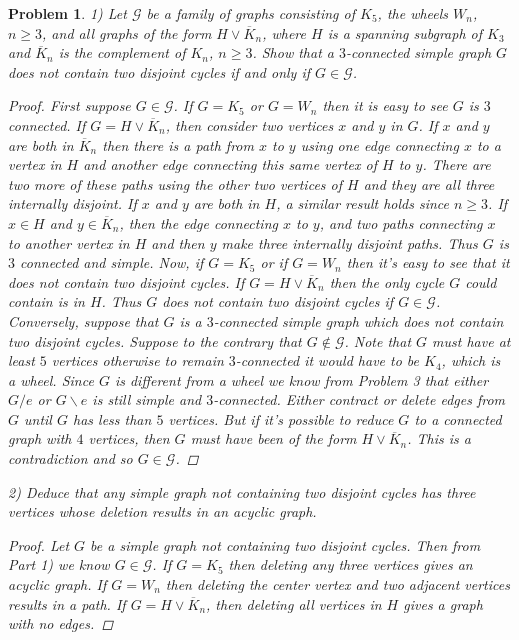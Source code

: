 \documentclass{article}
\newtheorem{problem}{Problem}
\begin{document}
\begin{problem}
1) Let $\mathcal{G}$ be a family of graphs consisting of $K_5$, the wheels $W_n$, $n \geq 3$, and all graphs of the form $H \vee \overline{K}_n$, where $H$ is a spanning subgraph of $K_3$ and $\overline{K}_n$ is the complement of $K_n$, $n \geq 3$. Show that a $3$-connected simple graph $G$ does not contain two disjoint cycles if and only if $G \in \mathcal{G}$.
\begin{proof}
First suppose $G \in \mathcal{G}$. If $G = K_5$ or $G = W_n$ then it is easy to see $G$ is $3$ connected. If $G = H \vee \overline{K}_n$, then consider two vertices $x$ and $y$ in $G$. If $x$ and $y$ are both in $\overline{K}_n$ then there is a path from $x$ to $y$ using one edge connecting $x$ to a vertex in $H$ and another edge connecting this same vertex of $H$ to $y$. There are two more of these paths using the other two vertices of $H$ and they are all three internally disjoint. If $x$ and $y$ are both in $H$, a similar result holds since $n \geq 3$. If $x \in H$ and $y \in \overline{K}_n$, then the edge connecting $x$ to $y$, and two paths connecting $x$ to another vertex in $H$ and then $y$ make three internally disjoint paths. Thus $G$ is $3$ connected and simple. Now, if $G = K_5$ or if $G = W_n$ then it's easy to see that it does not contain two disjoint cycles. If $G = H \vee \overline{K}_n$ then the only cycle $G$ could contain is in $H$. Thus $G$ does not contain two disjoint cycles if $G \in \mathcal{G}$.
Conversely, suppose that $G$ is a $3$-connected simple graph which does not contain two disjoint cycles. Suppose to the contrary that $G \notin \mathcal{G}$. Note that $G$ must have at least $5$ vertices otherwise to remain $3$-connected it would have to be $K_4$, which is a wheel. Since $G$ is different from a wheel we know from Problem 3 that either $G/e$ or $G \backslash e$ is still simple and $3$-connected. Either contract or delete edges from $G$ until $G$ has less than $5$ vertices. But if it's possible to reduce $G$ to a connected graph with $4$ vertices, then $G$ must have been of the form $H \vee \overline{K}_n$. This is a contradiction and so $G \in \mathcal{G}$.
\end{proof}
2) Deduce that any simple graph not containing two disjoint cycles has three vertices whose deletion results in an acyclic graph.
\begin{proof}
Let $G$ be a simple graph not containing two disjoint cycles. Then from Part 1) we know $G \in \mathcal{G}$. If $G = K_5$ then deleting any three vertices gives an acyclic graph. If $G = W_n$ then deleting the center vertex and two adjacent vertices results in a path. If $G = H \vee \overline{K}_n$, then deleting all vertices in $H$ gives a graph with no edges.
\end{proof}
\end{problem}
\end{document}
